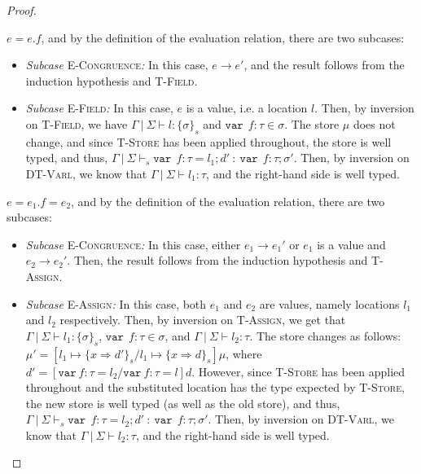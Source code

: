 \documentclass{llncs}
\newcommand{\keywadj}[1]{\mathtt{#1}}
\newcommand{\keyw}[1]{\keywadj{#1}~}
\newcommand{\pcase}[1][]{
  \if\relax\detokenize{#1}\relax
    \def\thiscase{}
  \else
    \def\thiscase{~#1}
  \fi
  \item
}
\begin{document}
\begin{proof}
\begin{pcases}
\pcase[\textsc{T-Field}]
$e = e.f$, and by the definition of the evaluation relation, there are two subcases:
\\
\begin{itemize}
\item[]  \textit{Subcase} \textsc{E-Congruence}\textit{:} In this case, $e \longrightarrow e'$, and the result follows from the induction hypothesis and \textsc{T-Field}.
\\
\item[]  \textit{Subcase} \textsc{E-Field}\textit{:} In this case, $e$ is a value, i.e. a location $l$. Then, by inversion on  \textsc{T-Field}, we have $\Gamma~|~\Sigma \vdash l : \{\sigma\}_s$ and $\keyw{var}~ f : \tau \in \sigma$. The store $\mu$ does not change, and since \textsc{T-Store} has been applied throughout, the store is well typed, and thus, \mbox{$\Gamma~|~\Sigma \vdash_s \keyw{var}~ f : \tau = l_1; d'~:~\keyw{var}~ f : \tau; \sigma'$}. Then, by inversion on \textsc{DT-Varl}, we know that $\Gamma~|~\Sigma \vdash l_1 : \tau$, and the right-hand side is well typed.
\\
\end{itemize}

\pcase[\textsc{T-Assign}]
$e = e_1.f=e_2$, and by the definition of the evaluation relation, there are two subcases:
\\
\begin{itemize}
\item[]  \textit{Subcase} \textsc{E-Congruence}\textit{:} In this case, either $e_1 \longrightarrow e_1'$ or $e_1$ is a value and $e_2 \longrightarrow e_2'$. Then, the result follows from the induction hypothesis and \textsc{T-Assign}.
\\
\item[]  \textit{Subcase} \textsc{E-Assign}\textit{:} In this case, both $e_1$ and $e_2$ are values, namely locations $l_1$ and $l_2$ respectively. Then, by inversion on \textsc{T-Assign}, we get that $\Gamma~|~\Sigma \vdash l_1 : \{\sigma\}_s$, $\keyw{var}~ f : \tau \in \sigma$, and $\Gamma~|~\Sigma \vdash l_2 : \tau$. The store changes as follows: $\mu' = [l_1 \mapsto \{ x \Rightarrow d' \}_{s}/l_1 \mapsto \{ x \Rightarrow d \}_{s}]\mu$, where $d' = [\keyw{var} f:\tau = l_2/\keyw{var} f:\tau = l]d$. However, since \textsc{T-Store} has been applied throughout and the substituted location has the type expected by \textsc{T-Store}, the new store is well typed (as well as the old store), and thus, \mbox{$\Gamma~|~\Sigma \vdash_s \keyw{var}~ f : \tau = l_2; d'~:~\keyw{var}~ f : \tau; \sigma'$}. Then, by inversion on \textsc{DT-Varl}, we know that $\Gamma~|~\Sigma \vdash l_2 : \tau$, and the right-hand side is well typed.
\\
\end{itemize}


\end{pcases}
\end{proof}
\end{document}
